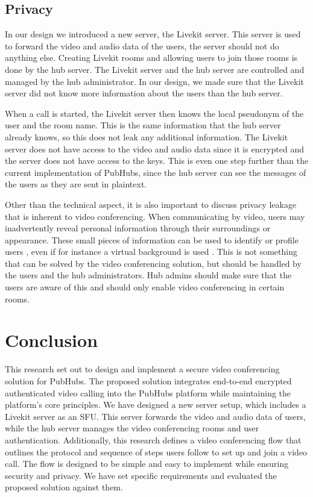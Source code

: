 \documentclass{report}
\begin{document}
\section{Privacy}
In our design we introduced a new server, the Livekit server. This server is used to forward the video and audio data
of the users, the server should not do anything else. Creating Livekit rooms and allowing users to join
those rooms is done by the hub server. The Livekit server and the hub server are controlled and managed by the hub
administrator. In our design, we made sure that the Livekit server did not know more information about the users
than the hub server.

When a call is started, the Livekit server then knows the local pseudonym of the user and the room name. This is the
same information that the hub server already knows, so this does not leak any additional information. The Livekit server
does not have access to the video and audio data since it is encrypted and the server does not have access to the keys.
This is even one step further than the current implementation of PubHubs, since the hub server can see the messages of
the users as they are sent in plaintext.

Other than the technical aspect, it is also important to discuss privacy leakage that is inherent to video conferencing.
When communicating by video, users may inadvertently reveal personal information through their surroundings or
appearance. These small pieces of information can be used to identify or profile users \cite{kagan_zooming_2024},
even if for instance a virtual background is used \cite{hilgefort_spying_2021}. This is not something that can be
solved by the video conferencing solution, but should be handled by the users and the hub administrators. Hub admins
should make sure that the users are aware of this and should only enable video conferencing in certain rooms.

\chapter{Conclusion}
This research set out to design and implement a secure video conferencing solution for PubHubs. The proposed
solution integrates end-to-end encrypted authenticated video calling into the PubHubs platform while maintaining
the platform's core principles. We have designed a new server setup, which includes a Livekit server as an SFU.
This server forwards the video and audio data of users, while the hub server manages the video conferencing rooms
and user authentication. Additionally, this research defines a video conferencing flow that outlines the protocol
and sequence of steps users follow to set up and join a video call. The flow is designed to be simple and easy to
implement while ensuring security and privacy. We have set specific requirements and evaluated the proposed
solution against them.
\end{document}
